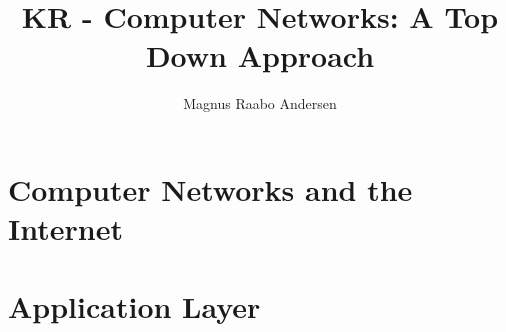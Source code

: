 \documentclass[a4paper]{article}
\title{KR - Computer Networks: A Top Down Approach}
\author{Magnus Raabo Andersen}
\numberwithin{equation}{section}
\begin{document}
\maketitle
\thispagestyle{empty}
\tableofcontents
\newpage
\setcounter{page}{1}

\section{Computer Networks and the Internet}









\section{Application Layer}









\end{document}
